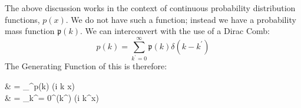 \documentclass[fleqn,usenatbib]{acmart}
\begin{document}
				The above discussion works in the context of continuous probability distribution functions, $p(x)$. We do not have such a function; instead we have a probability mass function $\mathfrak{p}(k)$. We can interconvert with the use of a Dirac Comb:
				\begin{equation}
					p(k) = \sum_{k^\prime = 0}^\infty \mathfrak{p}(k) \delta(k - k^\prime)
				\end{equation}
				\def\p{\mathfrak{p}}
				The Generating Function of this is therefore:
				\begin{spalign}
					 & = \int_{\infty}^\infty p(k) \exp(i k x)
					\\
					& =  \sum_{k^\prime = 0}^\infty \p(k^\prime) \exp(i k^\prime x) 
				\end{spalign}
\end{document}
